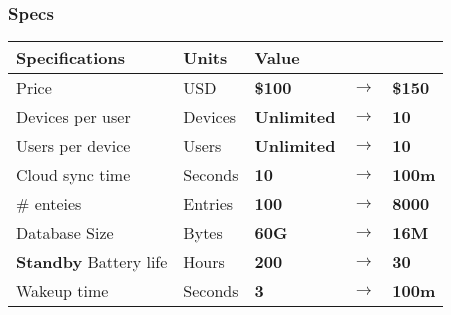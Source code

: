 \documentclass{beamer}
\begin{document}
\begin{frame}
  \frametitle{Specs}
  \begin{table}
    \centering
    \begin{tabular}{lllll}
      \hline
      Specifications                & Units   & \multicolumn{3}{l}{Value} \\
      \hline
      Price                         & USD     & \textbf{\$100}     & \textbf{$\rightarrow$} & \textbf{\$150} \\
      Devices per user              & Devices & \textbf{Unlimited} & \textbf{$\rightarrow$} & \textbf{10}    \\
      Users per device              & Users   & \textbf{Unlimited} & \textbf{$\rightarrow$} & \textbf{10}    \\
      Cloud sync time               & Seconds & \textbf{10}        & \textbf{$\rightarrow$} & \textbf{100m}  \\
      \# enteies                    & Entries & \textbf{100}       & \textbf{$\rightarrow$} & \textbf{8000}  \\
      Database Size                 & Bytes   & \textbf{60G}       & \textbf{$\rightarrow$} & \textbf{16M}   \\
      \textbf{Standby} Battery life & Hours   & \textbf{200}       & \textbf{$\rightarrow$} & \textbf{30}    \\
      Wakeup time                   & Seconds & \textbf{3}         & \textbf{$\rightarrow$} & \textbf{100m}  \\
      \hline
    \end{tabular}
  \end{table}
\end{frame}
\end{document}
